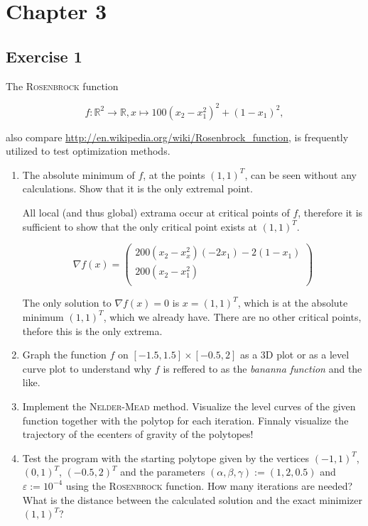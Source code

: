 \documentclass[11pt,oneside]{extarticle}
\newcommand{\Real}{\mathbb{R}}
\begin{document}
\section{Chapter 3}

\subsection{Exercise 1}

The \textsc{Rosenbrock} function

$$
f:\Real^2 \rightarrow \Real, x \mapsto 100(x_2-x_1^2)^2 + (1-x_1)^2,
$$

also compare \url{http://en.wikipedia.org/wiki/Rosenbrock_function}, is frequently
utilized to test optimization methods.

\begin{enumerate}

    \item The absolute minimum of $f$, at the points $(1,1)^T$, can be seen 
        without any calculations. Show that it is the only extremal point.

    All local (and thus global) extrama occur at critical points of $f$, therefore
    it is sufficient to show that the only critical point exists at $(1,1)^T$.

    $$\nabla f(x)=\begin{pmatrix}
        200(x_2 - x_x^2 ) (-2x_1) - 2(1-x_1) \\
        200(x_2-x_1^2) \\
    \end{pmatrix}$$

    The only solution to $\nabla f(x) = 0$ is $x=(1,1)^T$, which is at the
    absolute minimum $(1,1)^T$, which we already have. There are no other critical
    points, thefore this is the only extrema.

    \item Graph the function $f$ on $[-1.5,1.5]\times [-0.5,2]$ as a 3D plot or
        as a level curve plot to understand why $f$ is reffered to as the
        \emph{bananna function} and the like.

    \item Implement the \textsc{Nelder-Mead} method. Visualize the level curves of the
        given function together with the polytop for each iteration. Finnaly
        visualize the trajectory of the ecenters of gravity of the polytopes!

    \item Test the program with the starting polytope given by the vertices
        $(-1,1)^T$, $(0,1)^T$, $(-0.5,2)^T$ and the parameters
        $(\alpha,\beta,\gamma):=(1,2,0.5)$ and $\varepsilon := 10^{-4}$ using
        the \textsc{Rosenbrock} function. How many iterations are needed? What
        is the distance between the calculated solution and the exact minimizer
        $(1,1)^T$?


\end{enumerate}
\end{document}
